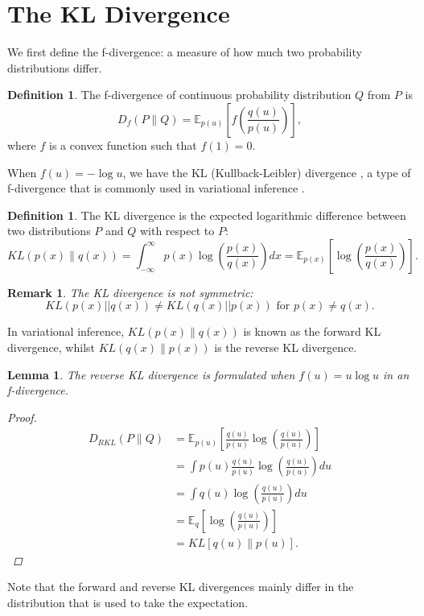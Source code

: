 \documentclass[honours,12pt]{unswthesis}
\newtheorem{lemma}[theorem]{Lemma}
\newtheorem{remark}[theorem]{Remark}
\numberwithin{equation}{section}
\theoremstyle{definition}
\newtheorem{definition}[theorem]{Definition}
\begin{document}
\section{The KL Divergence}
We first define the f-divergence: a measure of how much two probability distributions differ.
\begin{definition}
The f-divergence of continuous probability distribution $Q$ from $P$ is
\[D_f(P\|Q)=\mathbb{E}_{p(u)}\left[f\left(\frac{q(u)}{p(u)}\right)\right],\]
where $f$ is a convex function such that $f(1)=0$.
\end{definition}
When $f(u)=-\log u$, we have the KL (Kullback-Leibler) divergence \citep{KL}, a type of f-divergence that is commonly used in variational inference \citep{blei}.
\begin{definition}
The KL divergence is the expected logarithmic difference between two distributions $P$ and $Q$ with respect to $P$:
\begin{equation*}
KL(p(x)\|q(x))=\int_{-\infty}^\infty p(x)\log \left(\frac{p(x)}{q(x)}\right)dx=\mathbb{E}_{p(x)}\left[\log\left(\frac{p(x)}{q(x)}\right)\right].
\end{equation*}
\end{definition}
\begin{remark}
The KL divergence is not symmetric:
\begin{equation*}
KL(p(x)||q(x))\neq KL(q(x)||p(x))\text{ for }p(x)\neq q(x).
\end{equation*}
\end{remark}
In variational inference, $KL(p(x)\|q(x))$ is known as the forward KL divergence, whilst $KL(q(x)\|p(x))$ is the reverse KL divergence.
\begin{lemma}
The reverse KL divergence is formulated when $f(u)=u\log u$ in an f-divergence.
\begin{proof}
\begin{align*}
D_{RKL}(P\|Q)&=\mathbb{E}_{p(u)}\left[\frac{q(u)}{p(u)}\log \left(\frac{q(u)}{p(u)}\right)\right]\\
&=\int p(u)\frac{q(u)}{p(u)}\log\left(\frac{q(u)}{p(u)}\right)du\\
&= \int q(u)\log\left(\frac{q(u)}{p(u)}\right)du\\
&= \mathbb{E}_q\left[\log \left(\frac{q(u)}{p(u)}\right)\right]\\
&=KL[q(u)\|p(u)].
\end{align*}
\end{proof}
\end{lemma}
Note that the forward and reverse KL divergences mainly differ in the distribution that is used to take the expectation.
\end{document}
